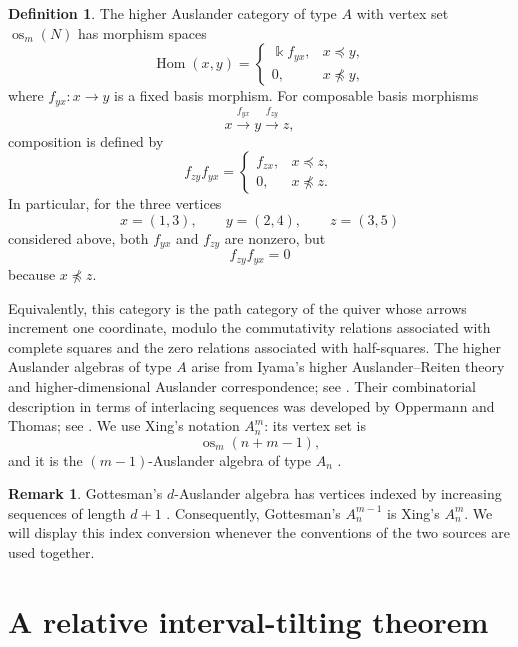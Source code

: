 \documentclass[12pt,a4paper,english,reqno]{amsart}
\theoremstyle{plain}
\theoremstyle{definition}
\newtheorem{definition}[theorem]{Definition}
\newtheorem{remark}[theorem]{Remark}
\newcommand{\kk}{\Bbbk}
\newcommand{\Hom}{\operatorname{Hom}}
\newcommand{\os}{\operatorname{os}}
\begin{document}
\begin{definition}
The higher Auslander category of type $A$ with vertex set $\os_m(N)$
has morphism spaces
\begin{equation}
\Hom(x,y)
=
\begin{cases}
\kk f_{yx}, & x\preceq y,\\
0,              & x\npreceq y,
\end{cases}
\label{eq:higher-hom}
\end{equation}
where $f_{yx}\colon x\to y$ is a fixed basis morphism. For composable
basis morphisms
\[
x\xrightarrow{f_{yx}}y\xrightarrow{f_{zy}}z,
\]
composition is defined by
\begin{equation}
f_{zy}f_{yx}
=
\begin{cases}
f_{zx}, & x\preceq z,\\
0,      & x\npreceq z.
\end{cases}
\label{eq:higher-composition}
\end{equation}
In particular, for the three vertices
\[
x=(1,3),\qquad y=(2,4),\qquad z=(3,5)
\]
considered above, both $f_{yx}$ and $f_{zy}$ are nonzero, but
\[
f_{zy}f_{yx}=0
\]
because $x\npreceq z$.
\end{definition}
Equivalently, this category is the path category of the quiver whose
arrows increment one coordinate, modulo the commutativity relations
associated with complete squares and the zero relations associated with
half-squares.
The higher Auslander algebras of type $A$ arise from Iyama's higher
Auslander--Reiten theory and higher-dimensional Auslander correspondence;
see \cite{Iyama2007,Iyama2011}. Their combinatorial description in terms of
interlacing sequences was developed by Oppermann and Thomas; see
\cite{OppermannThomas,JassoKulshammer}. We use Xing's notation
$A_n^m$: its vertex set is
\[
\os_m(n+m-1),
\]
and it is the $(m-1)$-Auslander algebra of type $A_n$
\cite[Section~4.1]{Xing}.

\begin{remark}
\label{rem:index-conversion}
Gottesman's $d$-Auslander algebra has vertices indexed by increasing
sequences of length $d+1$ \cite{Gottesman}. Consequently,
Gottesman's $A_n^{m-1}$ is Xing's $A_n^m$. We will display this index
conversion whenever the conventions of the two sources are used
together.
\end{remark}

\section{A relative interval-tilting theorem}
\label{sec:relative}
\end{document}
